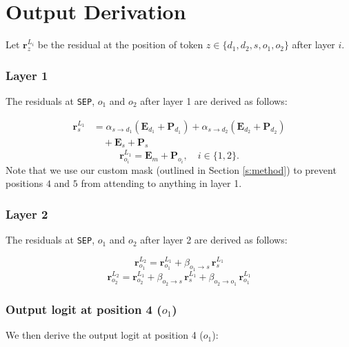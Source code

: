 \section{Output Derivation}\label{s:rollout}

Let $\boldsymbol r_z^{L_i}$ be the residual at the position of token $z \in \{d_1, d_2, s, o_1, o_2\}$ after layer $i$.

\subsubsection*{Layer 1}
The residuals at \texttt{SEP}, $o_1$ and $o_2$ after layer 1 are derived as follows:

\begin{equation}
\begin{split}
    \boldsymbol r_s^{L_1} &= \alpha_{s \to d_1}(\boldsymbol E_{d_1}+\boldsymbol P_{d_1}) + \alpha_{s \to d_2}(\boldsymbol E_{d_2}+\boldsymbol P_{d_2}) \\
    &\quad + \boldsymbol E_s + \boldsymbol P_s
\end{split}
\end{equation}
\begin{equation}
     \boldsymbol r_{o_i}^{L_1} = \boldsymbol E_m + \boldsymbol P_{o_i}, \quad i \in \{1,2\}.
\end{equation}
Note that we use our custom mask (outlined in Section \ref{s:method}) to prevent positions $4$ and $5$ from attending to anything in layer 1.

\subsubsection*{Layer 2}
The residuals at \texttt{SEP}, $o_1$ and $o_2$ after layer 2 are derived as follows:

\begin{equation}
    \boldsymbol r_{o_1}^{L_2} = \boldsymbol r_{o_1}^{L_1} + \beta_{o_1 \to s}\,\boldsymbol r_s^{L_1}
\end{equation}
\begin{equation}
    \boldsymbol r_{o_2}^{L_2} = \boldsymbol r_{o_2}^{L_1} + \beta_{o_2 \to s}\,\boldsymbol r_s^{L_1} + \beta_{o_2 \to o_1}\,\boldsymbol r_{o_1}^{L_1}
\end{equation}

\subsubsection*{Output logit at position 4 ($o_1$)}
We then derive the output logit at position 4 ($o_1$):

